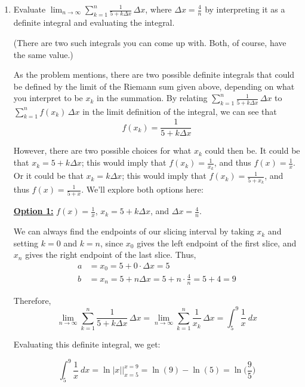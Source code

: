 \documentclass[main]{subfiles}
\begin{document}
\begin{enumerate}
  
  
  
  
  
  
  
\item 
\begin{problem}[10in]
Evaluate $\displaystyle \lim_{n \to \infty} \sum_{k=1}^n \frac{1}{5+k\Delta x}\, \Delta x$, where $\Delta x = \frac{4}{n}$
by interpreting it as a definite integral and evaluating the integral.

(There are two such integrals you can come up with. Both, of course, have the same value.)
\end{problem}

\begin{solution}
As the problem mentions, there are two possible definite integrals that could be defined by the limit of the Riemann sum given above, depending on what you interpret to be $x_k$ in the summation. By relating $\displaystyle  \sum_{k=1}^n \frac{1}{5+k\Delta x}\, \Delta x$ to $\displaystyle  \sum_{k=1}^n f(x_k)\, \Delta x$ in the limit definition of the integral, we can see that $$f(x_k)= \frac{1}{5+k\Delta x}$$ 

However, there are two possible choices for what $x_k$ could then be. It could be that $x_k=5+k\Delta x$; this would imply that $ f(x_k)=\frac{1}{x_k}$, and thus $ f(x)=\frac1x$. Or it could be that $x_k=k\Delta x$; this would imply that $f(x_k)= \frac{1}{5+x_k}$, and thus $f(x)= \frac{1}{5+x}$. We'll explore both options here:

\uline{\textbf{Option 1:}} $\displaystyle f(x)=\frac{1}{x}$, $x_k=5+k\Delta x$, and $\Delta x=\displaystyle\frac4n$.

We can always find the endpoints of our slicing interval by taking $x_k$ and setting $k=0$ and $k=n$, since $x_0$ gives the left endpoint of the first slice, and $x_n$ gives the right endpoint of the last slice. Thus, 
\begin{align*}
a&=x_0=5+0\cdot\Delta x=5\\
b&=x_n=5+n\Delta x=5+n\cdot\frac{4}{n}=5+4=9
\end{align*}

Therefore,
$$\displaystyle \lim_{n \to \infty} \sum_{k=1}^n \frac{1}{5+k\Delta x}\, \Delta x = \lim_{n \to \infty} \sum_{k=1}^n \frac{1}{x_k}\, \Delta x = \int_5^9 \frac1x\ dx$$

Evaluating this definite integral, we get:

$$\int_5^9 \frac1x\ dx = \ln|x|\Bigg|_{x=5}^{x=9} = \ln(9)-\ln(5)=\boxed{\ln\Bigg(\frac95\Bigg)}$$


\end{solution}
\end{enumerate}
\end{document}
